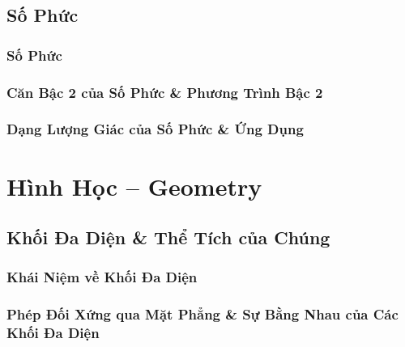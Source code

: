 \documentclass[oneside]{book}
\numberwithin{equation}{section}
\begin{document}

\chapter{Số Phức}

\section{Số Phức}


\section{Căn Bậc 2 của Số Phức \& Phương Trình Bậc 2}


\section{Dạng Lượng Giác của Số Phức \& Ứng Dụng}


\part{Hình Học -- Geometry}

\chapter{Khối Đa Diện \& Thể Tích của Chúng}

\section{Khái Niệm về Khối Đa Diện}


\section{Phép Đối Xứng qua Mặt Phẳng \& Sự Bằng Nhau của Các Khối Đa Diện}

\end{document}
